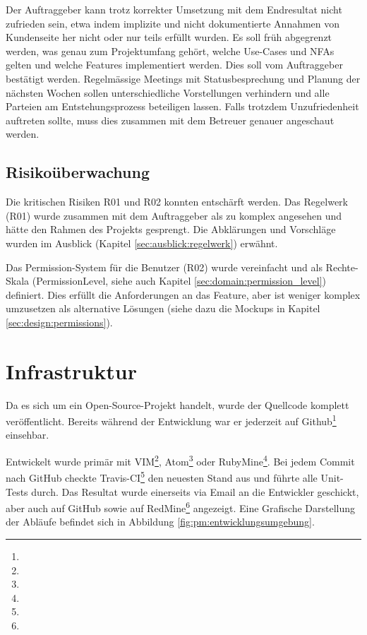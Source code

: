 {Der Auftraggeber kann trotz korrekter Umsetzung mit dem Endresultat nicht zufrieden sein, etwa indem implizite und nicht dokumentierte Annahmen von Kundenseite her nicht oder nur teils erfüllt wurden.}
{Es soll früh abgegrenzt werden, was genau zum Projektumfang gehört, welche Use-Cases und NFAs gelten und welche Features implementiert werden. Dies soll vom Auftraggeber bestätigt werden. Regelmässige Meetings mit Statusbesprechung und Planung der nächsten Wochen sollen unterschiedliche Vorstellungen verhindern und alle Parteien am Entstehungsprozess beteiligen lassen. Falls trotzdem Unzufriedenheit auftreten sollte, muss dies zusammen mit dem Betreuer genauer angeschaut werden.}

\subsection*{Risikoüberwachung}

Die kritischen Risiken R01 und R02 konnten entschärft werden. Das Regelwerk (R01) wurde zusammen mit dem Auftraggeber als zu komplex angesehen und hätte den Rahmen des Projekts gesprengt. Die Abklärungen und Vorschläge wurden im Ausblick (Kapitel \ref{sec:ausblick:regelwerk}) erwähnt.

Das Permission-System für die Benutzer (R02) wurde vereinfacht und als Rechte-Skala (PermissionLevel, siehe auch Kapitel \ref{sec:domain:permission_level}) definiert. Dies erfüllt die Anforderungen an das Feature, aber ist weniger komplex umzusetzen als alternative Lösungen (siehe dazu die Mockups in Kapitel \ref{sec:design:permissions}).

\xxx[Comment zu R07!]


\section{Infrastruktur} \label{sec:pm:infrastructure}

Da es sich um ein Open-Source-Projekt handelt, wurde der Quellcode komplett veröffentlicht. Bereits während der Entwicklung war er jederzeit auf Github\footnote{} einsehbar.

Entwickelt wurde primär mit VIM\footnote{}, Atom\footnote{} oder RubyMine\footnote{}. Bei jedem Commit nach GitHub checkte Travis-CI\footnote{} den neuesten Stand aus und führte alle Unit-Tests durch. Das Resultat wurde einerseits via Email an die Entwickler geschickt, aber auch auf GitHub sowie auf RedMine\footnote{} angezeigt. Eine Grafische Darstellung der Abläufe befindet sich in Abbildung \ref{fig:pm:entwicklungsumgebung}.


